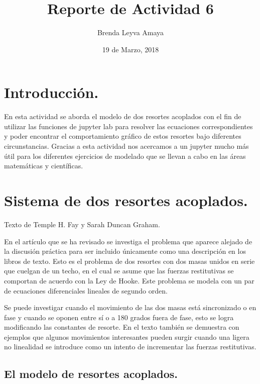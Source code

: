 \documentclass{article} %
\title{Reporte de Actividad 6}
\author{Brenda Leyva Amaya}
\date{19 de Marzo, 2018}
\begin{document}
\maketitle %


\section{Introducción.}

En esta actividad se aborda el modelo de dos resortes acoplados con el fin de utilizar las funciones de jupyter lab para resolver las ecuaciones correspondientes y poder encontrar el comportamiento gráfico de estos resortes bajo diferentes circunstancias. Gracias a esta actividad nos acercamos a un jupyter mucho más útil para los diferentes ejercicios de modelado que se llevan a cabo en las áreas matemáticas y científicas. 

\section{Sistema de dos resortes acoplados.}

Texto de Temple H. Fay y Sarah Duncan Graham.

\vspace{0.5 cm}

En el artículo que se ha revisado se investiga el problema que aparece alejado de la discusión práctica para ser incluido únicamente como una descripción en los libros de texto. Esto es el problema de dos resortes con dos masas unidos en serie que cuelgan de un techo, en el cual se asume que las fuerzas restitutivas se comportan de acuerdo con la Ley de Hooke. Este problema se modela con un par de ecuaciones diferenciales lineales de segundo orden. 

\vspace{0.5 cm}

Se puede investigar cuando el movimiento de las dos masas está sincronizado o en fase y cuando se oponen entre sí o a 180 grados fuera de fase, esto se logra modificando las constantes de resorte. En el texto también se demuestra con ejemplos que algunos movimientos interesantes pueden surgir cuando una ligera no linealidad se introduce como un intento de incrementar las fuerzas restitutivas. 

\subsection{El modelo de resortes acoplados.}
\end{document}
